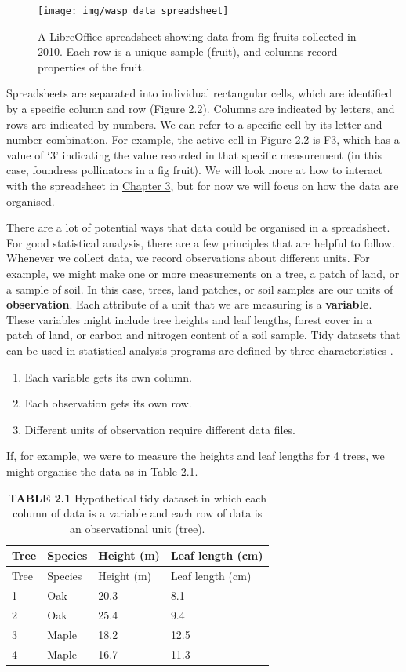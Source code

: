 \documentclass[
  openany]{krantz}
\providecommand{\tightlist}{%
  \setlength{\itemsep}{0pt}\setlength{\parskip}{0pt}}
\begin{document}
\begin{figure}
\texttt{[image: img/wasp\_data\_spreadsheet]} \caption{A LibreOffice spreadsheet showing data from fig fruits collected in 2010. Each row is a unique sample (fruit), and columns record properties of the fruit.}\label{fig:unnamed-chunk-4}
\end{figure}

Spreadsheets are separated into individual rectangular cells, which are identified by a specific column and row (Figure 2.2).
Columns are indicated by letters, and rows are indicated by numbers.
We can refer to a specific cell by its letter and number combination.
For example, the active cell in Figure 2.2 is F3, which has a value of `3' indicating the value recorded in that specific measurement (in this case, foundress pollinators in a fig fruit).
We will look more at how to interact with the spreadsheet in \protect\hyperlink{Chapter_3}{Chapter 3}, but for now we will focus on how the data are organised.

There are a lot of potential ways that data could be organised in a spreadsheet.
For good statistical analysis, there are a few principles that are helpful to follow.
Whenever we collect data, we record observations about different units.
For example, we might make one or more measurements on a tree, a patch of land, or a sample of soil.
In this case, trees, land patches, or soil samples are our units of \textbf{observation}.
Each attribute of a unit that we are measuring is a \textbf{variable}.
These variables might include tree heights and leaf lengths, forest cover in a patch of land, or carbon and nitrogen content of a soil sample.
Tidy datasets that can be used in statistical analysis programs are defined by three characteristics \citep{Wickham2014}.

\begin{enumerate}
\def\labelenumi{\arabic{enumi}.}
\tightlist
\item
  Each variable gets its own column.
\item
  Each observation gets its own row.
\item
  Different units of observation require different data files.
\end{enumerate}

If, for example, we were to measure the heights and leaf lengths for 4 trees, we might organise the data as in Table 2.1.

\begin{longtable}[]{@{}llll@{}}
\caption{\textbf{TABLE 2.1} Hypothetical tidy dataset in which each column of data is a variable and each row of data is an observational unit (tree).}\tabularnewline
\toprule
Tree & Species & Height (m) & Leaf length (cm) \\
\midrule
\endfirsthead
\toprule
Tree & Species & Height (m) & Leaf length (cm) \\
\midrule
\endhead
1 & Oak & 20.3 & 8.1 \\
2 & Oak & 25.4 & 9.4 \\
3 & Maple & 18.2 & 12.5 \\
4 & Maple & 16.7 & 11.3 \\
\bottomrule
\end{longtable}
\end{document}
